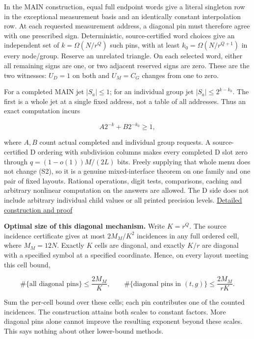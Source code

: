\documentclass[11pt,a4paper]{article}
\begin{document}
In the MAIN construction, equal full endpoint words give a literal
singleton row in the exceptional measurement basis and an identically
constant interpolation row. At each requested measurement address, a
diagonal pin must therefore agree with one prescribed sign.
Deterministic, source-certified word choices give an independent set of
\(k=\Omega(N/r^Q)\) such pins, with at least \(k_0=\Omega(N/r^{Q+1})\)
in every node/group. Reserve an unrelated triangle. On each selected
word, either all remaining signs are one, or two adjacent reserved signs
are zero. These are the two witnesses: \(U_D=1\) on both and \(U_M=C_G\)
changes from one to zero.

For a completed MAIN jet \(|S_a|\le1\); for an individual group jet
\(|S_a|\le2^{k-k_0}\). The first is a whole jet at a single fixed
address, not a table of all addresses. Thus an exact computation incurs

\[
                   A2^{-k}+B2^{-k_0}\ge1,                       \tag{S2}
\]

where \(A,B\) count actual completed and individual group requests. A
source-certified D ordering with subdivision columns makes every
completed D slot zero through \(q=(1-o(1))M/(2L)\) bits. Freely
supplying that whole menu does not change (S2), so it is a genuine
mixed-interface theorem on one family and one pair of fixed layouts.
Rational operations, digit tests, comparisons, caching and arbitrary
nonlinear computation on the answers are allowed. The D side does not
include arbitrary individual child values or all printed precision
levels. \hyperref[v9-section-joint-algorithms]{Detailed construction and
proof}

\textbf{Optimal size of this diagonal mechanism.} Write \(K=r^Q\). The
source incidence certificate gives at most \(2M_M/K^2\) incidences in
any full ordered cell, where \(M_M=12N\). Exactly \(K\) cells are
diagonal, and exactly \(K/r\) are diagonal with a specified symbol at a
specified coordinate. Hence, on every layout meeting this cell bound,

\[
 \#\{\text{all diagonal pins}\}\le\frac{2M_M}{K},\qquad
 \#\{\text{diagonal pins in }(t,g)\}\le\frac{2M_M}{rK}.          \tag{S3}
\]

Sum the per-cell bound over these cells; each pin contributes one of the
counted incidences. The construction attains both scales to constant
factors. More diagonal pins alone cannot improve the resulting exponent
beyond these scales. This says nothing about other lower-bound methods.
\end{document}
